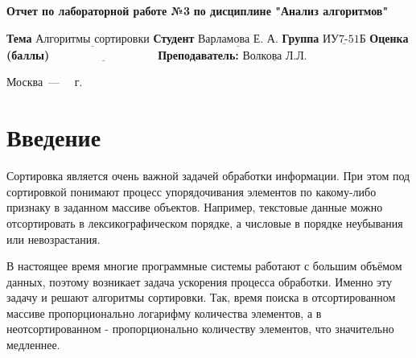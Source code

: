 \documentclass{report}
\begin{document}
\begin{titlepage}
	
	\begin{center}
		\noindent\begin{minipage}{1.3\textwidth}\centering
			\Large\textbf{  Отчет по лабораторной работе №3}\newline
			\textbf{по дисциплине "Анализ алгоритмов"}\newline\newline
		\end{minipage}
	\end{center}
	
	\noindent\textbf{Тема} $\underline{\text{Алгоритмы сортировки}}$\newline\newline
	\noindent\textbf{Студент} $\underline{\text{Варламова Е. А.}}$\newline\newline
	\noindent\textbf{Группа} $\underline{\text{ИУ7-51Б}}$\newline\newline
	\noindent\textbf{Оценка (баллы)} $\underline{\text{~~~~~~~~~~~~~~~~~~~~~~~~~~~}}$\newline\newline
	\noindent\textbf{Преподаватель: } $\underline{\text{Волкова Л.Л.}}$\newline\newline\newline
	
	\begin{center}
		\vfill
		Москва~---~\the\year
		~г.
	\end{center}
\end{titlepage}


\tableofcontents
  
\newpage
\chapter*{Введение}


Сортировка является очень важной задачей обработки информации. При этом под сортировкой понимают процесс упорядочивания элементов по какому-либо признаку в заданном массиве объектов. Например, текстовые данные можно отсортировать в лексикографическом порядке, а числовые в порядке неубывания или невозрастания.

В настоящее время многие программные системы работают с большим объёмом данных, поэтому возникает задача ускорения процесса обработки. Именно эту задачу и решают алгоритмы сортировки. Так, время поиска в отсортированном массиве пропорционально логарифму количества элементов, а в неотсортированном - пропорционально количеству элементов, что значительно медленнее.
\end{document}
